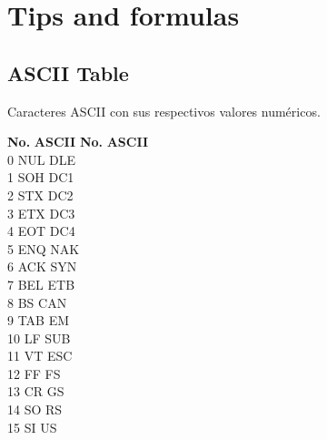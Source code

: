 \documentclass[10pt,letterpaper,twocolumn,twosided]{article}
\begin{document}
\section{Tips and formulas}

\subsection{ASCII Table}
Caracteres ASCII con sus respectivos valores numéricos.


\begin{tabbing}
\textbf{No.}\hspace{1cm} \=  \textbf{ASCII}\hspace{2cm} \= \textbf{No.}\hspace{1cm} \= \textbf{ASCII}\hspace{2cm}  \\ 
0 \> NUL  \> DLE \\
1 \> SOH  \> DC1 \\
2 \> STX  \> DC2 \\
3 \> ETX  \> DC3 \\
4 \> EOT  \> DC4 \\
5 \> ENQ  \> NAK \\
6 \> ACK  \> SYN \\
7 \> BEL  \> ETB \\
8 \> BS  \> CAN \\
9 \> TAB  \> EM \\
10 \> LF  \> SUB \\
11 \> VT  \> ESC \\
12 \> FF  \> FS \\
13 \> CR  \> GS \\
14 \> SO  \> RS \\
15 \> SI  \> US \\ 
\end{tabbing}
\end{document}
